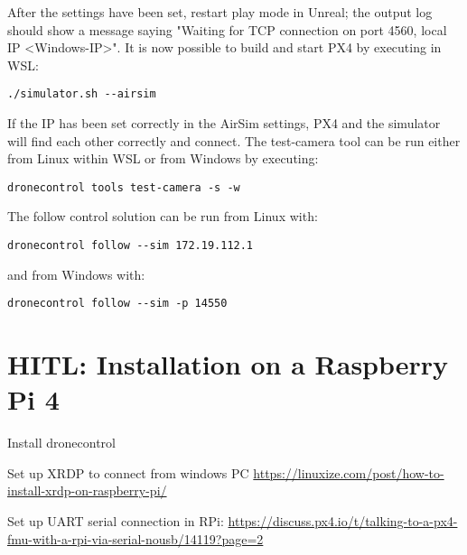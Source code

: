 After the settings have been set, restart play mode in Unreal; the output log should show a message saying "Waiting for TCP connection on port 4560, local IP <Windows-IP>".
It is now possible to build and start PX4 by executing in WSL:
\begin{verbatim}
./simulator.sh --airsim
\end{verbatim}

If the IP has been set correctly in the AirSim settings, 
PX4 and the simulator will find each other correctly and connect.
The test-camera tool can be run either from Linux within WSL or from Windows by executing:
\begin{verbatim}
dronecontrol tools test-camera -s -w
\end{verbatim}

The follow control solution can be run from Linux with:
\begin{verbatim}
dronecontrol follow --sim 172.19.112.1
\end{verbatim}
and from Windows with:
\begin{verbatim}
dronecontrol follow --sim -p 14550
\end{verbatim}

\section{HITL: Installation on a Raspberry Pi 4}
\label{app:install-dronecontrol-rpi}

Install dronecontrol
        
Set up XRDP to connect from windows PC
\url{https://linuxize.com/post/how-to-install-xrdp-on-raspberry-pi/}

Set up UART serial connection in RPi: 
\url{https://discuss.px4.io/t/talking-to-a-px4-fmu-with-a-rpi-via-serial-nousb/14119?page=2}


